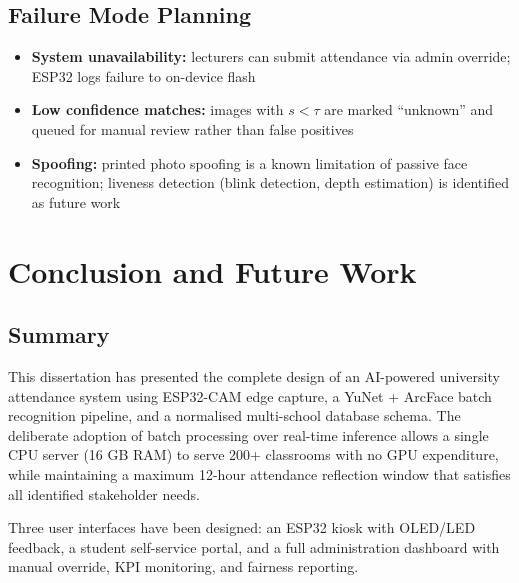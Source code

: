 \documentclass[12pt,a4paper]{report}
\begin{document}
\section{Failure Mode Planning}
\begin{itemize}
  \item \textbf{System unavailability:} lecturers can submit attendance via admin override; ESP32 logs failure to on-device flash
  \item \textbf{Low confidence matches:} images with $s < \tau$ are marked ``unknown'' and queued for manual review rather than false positives
  \item \textbf{Spoofing:} printed photo spoofing is a known limitation of passive face recognition; liveness detection (blink detection, depth estimation) is identified as future work
\end{itemize}

\chapter{Conclusion and Future Work}

\section{Summary}
This dissertation has presented the complete design of an AI-powered university attendance system using ESP32-CAM edge capture, a YuNet + ArcFace batch recognition pipeline, and a normalised multi-school database schema. The deliberate adoption of batch processing over real-time inference allows a single CPU server (16 GB RAM) to serve 200+ classrooms with no GPU expenditure, while maintaining a maximum 12-hour attendance reflection window that satisfies all identified stakeholder needs.

Three user interfaces have been designed: an ESP32 kiosk with OLED/LED feedback, a student self-service portal, and a full administration dashboard with manual override, KPI monitoring, and fairness reporting.
\end{document}
